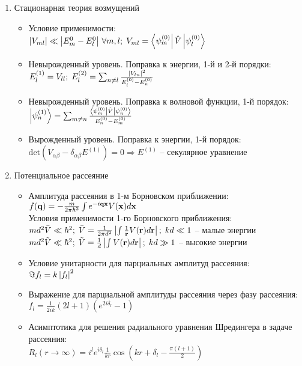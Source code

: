 \begin{enumerate}[label=\textbf{\underline{\arabic*.}}]
\item Стационарная теория возмущений  \begin{itemize}
            \item Условие применимости: \\
            $ \abs{V_{ml}} \ll \abs{E_m^0 - E_l^0}\, \forall m,l;\; V_{ml}=\matrixel{\psi_m^{(0)}}{\hat{V}}{\psi_l^{(0)}} $
            \item Невырожденный уровень. Поправка к энергии, 1-й и 2-й порядки: \\
            $ E_l^{(1)} = V_{ll};\; E_l^{(2)} = \sum_{n \neq l} \frac{\left| V_{ln} \right|^2}{E_l^{(0)} - E_n^{(0)}} $
            \item Невырожденный уровень. Поправка к волновой функции, 1-й порядок: \\
            $ \ket{\psi_n^{(1)}} = \sum_{m \neq n} \frac{\matrixel{\psi_m^{(0)}}{\hat{V}}{\psi_n^{(0)}}}{E_n^{(0)} - E_m^{(0)}} $
            \item Вырожденный уровень. Поправка к энергии, 1-й порядок: \\
            $ \text{det}(V_{\alpha\beta} - \delta_{\alpha\beta}E^{(1)})=0 \Rightarrow E^{(1)} $ -- секулярное уравнение

        \end{itemize}
\item Потенциальное рассеяние  \begin{itemize}
            \item Амплитуда рассеяния в 1-м Борновском приближении: \\
            $ f(\mathbf{q}) = -\frac{m}{2\pi\hbar^2}\int e^{-i\mathbf{q}\mathbf{x}} V(\mathbf{x})d\mathbf{x} $ \\
            Условия применимости 1-го Борновского приближения: \\
            $ md^2\bar{V} \ll \hbar^2;\; \bar{V} = \frac1{2\pi d^2} \left| \int \frac1{\mathbf{r}}V(\mathbf{r})d\mathbf{r} \right|;\; kd \ll 1 $ -- малые энергии \\
            $ md^2\tilde{V} \ll \hbar^2;\; \tilde{V} = \frac1{d} \left| \int V(\mathbf{r})d\mathbf{r} \right|;\; kd \gg 1 $ -- высокие энергии \\
            \item Условие унитарности для парциальных амплитуд рассеяния: \\
            $ \Im{f_l} = k \left| f_l \right|^2 $
            \item Выражение для парциальной амплитуды рассеяния через фазу рассеяния: \\
            $ f_l = \frac1{2ik}(2l+1)(e^{2i\delta_l} - 1) $
            \item Асимптотика для решения радиального уравнения Шредингера в задаче рассеяния: \\
            $ R_l(r \rightarrow \infty) = i^l e^{i\delta_l} \frac1{kr} \cos(kr+\delta_l - \frac{\pi(l+1)}{2}) $


\end{itemize}
\end{enumerate}
